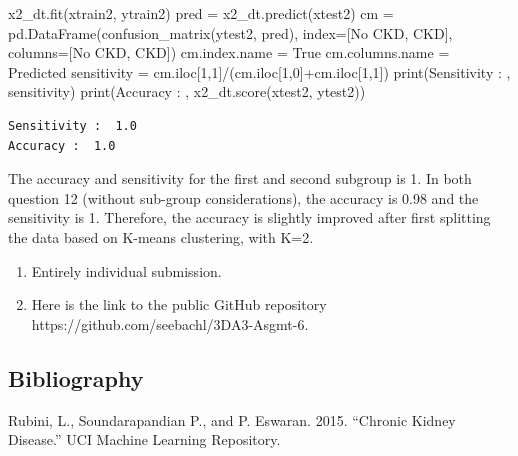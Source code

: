 \documentclass[
  11pt,
  letterpaper,
  DIV=11,
  numbers=noendperiod]{scrartcl}
\newenvironment{Shaded}{\begin{snugshade}}{\end{snugshade}}
\newcommand{\BuiltInTok}[1]{\textcolor[rgb]{0.00,0.23,0.31}{#1}}
\newcommand{\DecValTok}[1]{\textcolor[rgb]{0.68,0.00,0.00}{#1}}
\newcommand{\NormalTok}[1]{\textcolor[rgb]{0.00,0.23,0.31}{#1}}
\newcommand{\OperatorTok}[1]{\textcolor[rgb]{0.37,0.37,0.37}{#1}}
\newcommand{\StringTok}[1]{\textcolor[rgb]{0.13,0.47,0.30}{#1}}
\newlength{\cslhangindent}
\newenvironment{CSLReferences}[2] %
 {\begin{list}{}{%
  \setlength{\itemindent}{0pt}
  \setlength{\leftmargin}{0pt}
  \setlength{\parsep}{0pt}
  \ifodd #1
   \setlength{\leftmargin}{\cslhangindent}
   \setlength{\itemindent}{-1\cslhangindent}
  \fi
  \setlength{\itemsep}{#2\baselineskip}}}
 {\end{list}}
\begin{document}
\begin{Shaded}
\begin{Highlighting}[]
\NormalTok{x2\_dt.fit(xtrain2, ytrain2)}
\NormalTok{pred }\OperatorTok{=}\NormalTok{ x2\_dt.predict(xtest2)}
\NormalTok{cm }\OperatorTok{=}\NormalTok{ pd.DataFrame(confusion\_matrix(ytest2, pred), index}\OperatorTok{=}\NormalTok{[}\StringTok{\textquotesingle{}No CKD\textquotesingle{}}\NormalTok{, }\StringTok{\textquotesingle{}CKD\textquotesingle{}}\NormalTok{], columns}\OperatorTok{=}\NormalTok{[}\StringTok{\textquotesingle{}No CKD\textquotesingle{}}\NormalTok{, }\StringTok{\textquotesingle{}CKD\textquotesingle{}}\NormalTok{])}
\NormalTok{cm.index.name }\OperatorTok{=} \StringTok{\textquotesingle{}True\textquotesingle{}}
\NormalTok{cm.columns.name }\OperatorTok{=} \StringTok{\textquotesingle{}Predicted\textquotesingle{}}
\NormalTok{sensitivity }\OperatorTok{=}\NormalTok{ cm.iloc[}\DecValTok{1}\NormalTok{,}\DecValTok{1}\NormalTok{]}\OperatorTok{/}\NormalTok{(cm.iloc[}\DecValTok{1}\NormalTok{,}\DecValTok{0}\NormalTok{]}\OperatorTok{+}\NormalTok{cm.iloc[}\DecValTok{1}\NormalTok{,}\DecValTok{1}\NormalTok{])}
\BuiltInTok{print}\NormalTok{(}\StringTok{\textquotesingle{}Sensitivity : \textquotesingle{}}\NormalTok{, sensitivity)}
\BuiltInTok{print}\NormalTok{(}\StringTok{\textquotesingle{}Accuracy : \textquotesingle{}}\NormalTok{, x2\_dt.score(xtest2, ytest2))}
\end{Highlighting}
\end{Shaded}

\begin{verbatim}
Sensitivity :  1.0
Accuracy :  1.0
\end{verbatim}

The accuracy and sensitivity for the first and second subgroup is 1. In
both question 12 (without sub-group considerations), the accuracy is
0.98 and the sensitivity is 1. Therefore, the accuracy is slightly
improved after first splitting the data based on K-means clustering,
with K=2.

\begin{enumerate}
\def\labelenumi{\arabic{enumi}.}
\setcounter{enumi}{13}
\item
  Entirely individual submission.
\item
  Here is the link to the public GitHub repository
  https://github.com/seebachl/3DA3-Asgmt-6.
\end{enumerate}

\subsection*{Bibliography}\label{bibliography}

\label{refs}
\begin{CSLReferences}{1}{0}
Rubini, L., Soundarapandian P., and P. Eswaran. 2015. {``{Chronic Kidney
Disease}.''} UCI Machine Learning Repository.

\end{CSLReferences}
\end{document}
